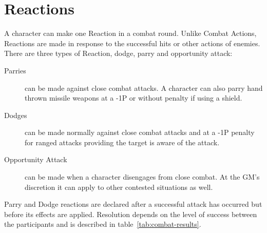 \section{Reactions}
\label{sec:defensive-reactions}
A character can make one Reaction in a combat round. Unlike Combat Actions, Reactions are made in response to the successful hits or other actions of enemies. There are three types of Reaction, dodge, parry and opportunity attack:
\begin{description}
	\item[Parries] can be made against close combat attacks. A character can also parry hand thrown missile weapons at a -1P or without penalty if using a shield.%
	\item[Dodges] can be made normally against close combat attacks and at a -1P penalty for ranged attacks providing the target is aware of the attack.  
	\item[Opportunity Attack] can be made when a character disengages from close combat. At the GM's discretion it can apply to other contested situations as well.
\end{description}

\noindent Parry and Dodge reactions are declared after a successful attack has occurred but before its effects are applied. Resolution depends on the level of success between the participants and is described in table~\ref{tab:combat-results}.




